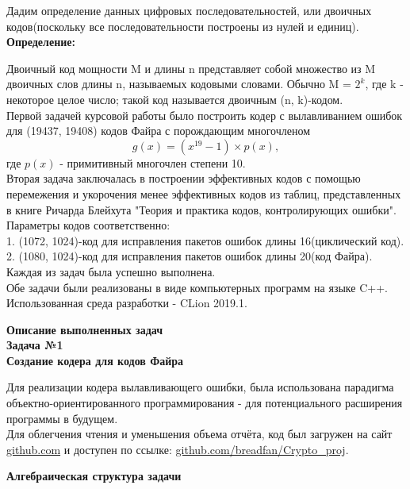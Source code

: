 \documentclass{article}
\begin{document}
            Дадим определение данных цифровых последовательностей, или двоичных кодов(поскольку все последовательности построены из нулей и единиц).\\
            
            \textbf{Определение:}
            
            	Двоичный код мощности M и длины n представляет собой множество из M двоичных слов длины n, называемых кодовыми словами. Обычно M = $2^k$, где k - некоторое целое число; такой код называется двоичным (n, k)-кодом.\\
           
           	Первой задачей курсовой работы было построить кодер с вылавливанием ошибок для (19437, 19408) кодов Файра с порождающим многочленом $$g(x) = (x^{19} - 1) \times p(x),$$ где $p(x)$ - примитивный многочлен степени 10. \\ 
           	
           	Вторая задача заключалась в построении эффективных кодов с помощью перемежения и укорочения менее эффективных кодов из таблиц, представленных в книге Ричарда Блейхута "Теория и практика кодов, контролирующих ошибки". 
           	\\Параметры кодов соответственно:\\ 1. (1072, 1024)-код для исправления пакетов ошибок длины 16(циклический код).\\2. (1080, 1024)-код для исправления пакетов ошибок длины 20(код Файра).\\
           	
           	Каждая из задач была успешно выполнена.\\
           	Обе задачи были реализованы в виде компьютерных программ на языке C++. Использованная среда разработки - CLion 2019.1.
        
        
    \newpage
        \begin{center}
            \large \textbf {Описание выполненных задач}\\
            \large \textbf {Задача №1}\\
            \large \textbf {Создание кодера для кодов Файра}
        \end{center}
    
    	Для реализации кодера вылавливающего ошибки, была использована парадигма объектно-ориентированного программирования - для потенциального расширения программы в будущем.\\
    	
    	Для облегчения чтения и уменьшения объема отчёта, код был загружен на сайт \href{https://github.com}{github.com} и доступен по ссылке:
    	\href{https://github.com/breadfan/Crypto_proj}{github.com/breadfan/Crypto\_proj}.\\
       	\begin{center}
       		\large \textbf {Алгебраическая структура задачи}
        \end{center}	
        
\end{document}
